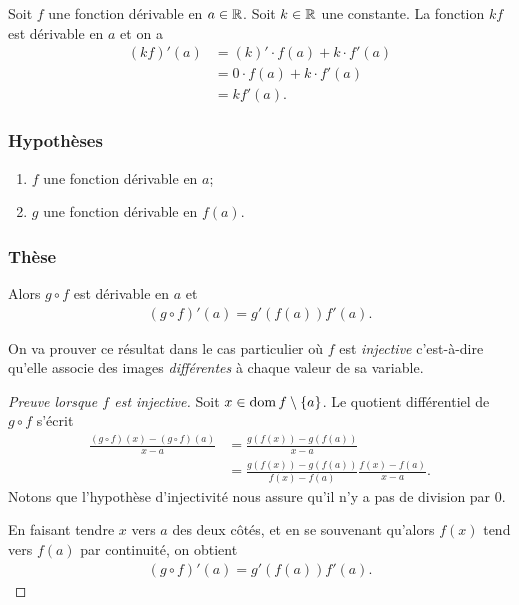 \documentclass[main.tex]{subfiles}
\begin{document}
\begin{example}
    [Dérivée de $k f(x)$]
    Soit $f$ une fonction dérivable en $a \in \mathbb{R}$.
    Soit $k \in \mathbb{R}$ une constante. 
    La fonction $kf$ est dérivable en $a$ et on a 
    \begin{align}
        (kf)'(a) 
        &= (k)' \cdot f(a) + k \cdot f'(a)\\
        &= 0 \cdot f(a) + k \cdot f'(a)\\
        &= kf'(a).
    \end{align}
\end{example}

\begin{proposition}

    \subsubsection{Hypothèses}

    \begin{enumerate}
        \item $f$ une fonction dérivable en $a$;
        \item $g$ une fonction dérivable en $f(a)$.
    \end{enumerate}

    \subsubsection{Thèse}

    Alors $g \circ f$ est dérivable en $a$ et
    \begin{align}
        (g \circ f)'(a) = g'(f(a)) f'(a).
    \end{align}
\end{proposition}

On va prouver ce résultat dans le cas particulier où $f$ est \emph{injective}
c'est-à-dire qu'elle associe des images \emph{différentes} à chaque valeur de sa variable.

\begin{proof}[Preuve lorsque $f$ est injective]
    Soit $x \in \operatorname{dom} f \setminus \{a\}$.
    Le quotient différentiel de $g \circ f$ s'écrit
    \begin{align}
        \frac {(g \circ f)(x) - (g \circ f)(a)} {x - a}
        &= \frac {g(f(x)) - g(f(a))} {x - a}\\
        &= \frac {g(f(x)) - g(f(a))} {f(x) - f(a)} \frac {f(x) - f(a)} {x - a}.
    \end{align}
    Notons que l'hypothèse d'injectivité nous assure qu'il n'y a pas de division par $0$.

    En faisant tendre $x$ vers $a$ des deux côtés,
    et en se souvenant qu'alors $f(x)$ tend vers $f(a)$ par continuité,
    on obtient
    \begin{align}
        (g \circ f)'(a) = g'(f(a)) f'(a).
    \end{align}
\end{proof}
\end{document}
